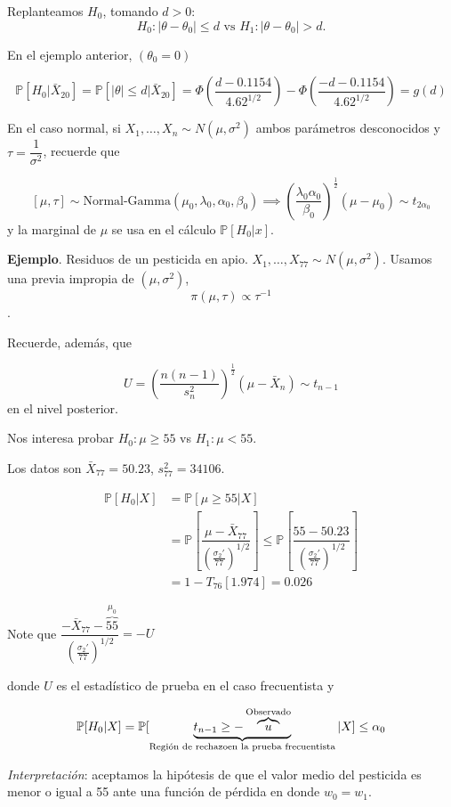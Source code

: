 \documentclass[
  12pt,
]{book}
\begin{document}
Replanteamos \(H_0\), tomando \(d>0\):
\[H_0: |\theta-\theta_0|\leq d \text{ vs } H_1: |\theta-\theta_0|>d.\]

En el ejemplo anterior, \((\theta_0 = 0)\)

\[\mathbb P[H_0|\bar X_{20}]=\mathbb P[|\theta|\leq d|\bar X_{20}] = \Phi\left(\dfrac{d-0.1154}{4.62^{1/2}}\right) - \Phi\left(\dfrac{-d-0.1154}{4.62^{1/2}}\right) = g(d)\]

En el caso normal, si \(X_1,\dots,X_n\sim N(\mu,\sigma^2)\) ambos parámetros desconocidos y \(\tau = \dfrac 1{\sigma^2}\), recuerde que

\[[\mu,\tau]\sim \text{Normal-Gamma}(\mu_0,\lambda_0,\alpha_0,\beta_0)\implies \left(\dfrac{\lambda_0\alpha_0}{\beta_0}\right)^{\frac 12}(\mu-\mu_0)\sim t_{2\alpha_0}\]
y la marginal de \(\mu\) se usa en el cálculo \(\mathbb P[H_0|x]\).

\textbf{Ejemplo}. Residuos de un pesticida en apio. \(X_1,\dots, X_{77}\sim N(\mu,\sigma^2)\). Usamos una previa impropia de \((\mu,\sigma^2)\),
\[\pi(\mu,\tau)\propto \tau^{-1}\].

Recuerde, además, que

\[U = \left(\dfrac{n(n-1)}{s_n^2}\right)^{\frac 12}(\mu-\bar X_n)\sim t_{n-1}\]
en el nivel posterior.

Nos interesa probar \(H_0: \mu\geq 55\) vs \(H_1:\mu<55\).

Los datos son \(\bar X_{77} = 50.23\), \(s_{77}^2=34106\).

\begin{align*}
\mathbb P[H_0|X] & = \mathbb P[\mu\geq 55|X] \\ & = \mathbb P\left[\dfrac{\mu-\bar X_{77}}{\left(\frac{\sigma_2'}{77}\right)^{1/2}}\right] \leq \mathbb P\left[\dfrac{55-50.23}{\left(\frac{\sigma_2'}{77}\right)^{1/2}}\right] \\ & = 1-T_{76}[1.974] = 0.026
\end{align*}

Note que \(\dfrac{-\bar X_{77}-\overbrace{55}^{\mu_0} }{\left(\frac{\sigma_2'}{77}\right)^{1/2}} = -U\)

donde \(U\) es el estadístico de prueba en el caso frecuentista y

\[\mathbb P[H_0|X] = \mathbb P[\underbrace{t_{n-1}\geq -\overbrace{u}^{\text{Observado}}}_{\text{Región de rechazo}\\\text{en la prueba frecuentista}}|X]\leq \alpha_0\]

\emph{Interpretación}: aceptamos la hipótesis de que el valor medio del pesticida es menor o igual a 55 ante una función de pérdida en donde \(w_0 = w_1\).
\end{document}
